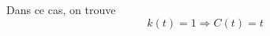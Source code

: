 \documentclass[../main.tex]{subfiles}
\begin{document}
\begin{exemple}
Dans ce cas, on trouve
\[ 
	k( t) = 1 \Rightarrow C( t) = t
\]





\end{exemple}
\end{document}
